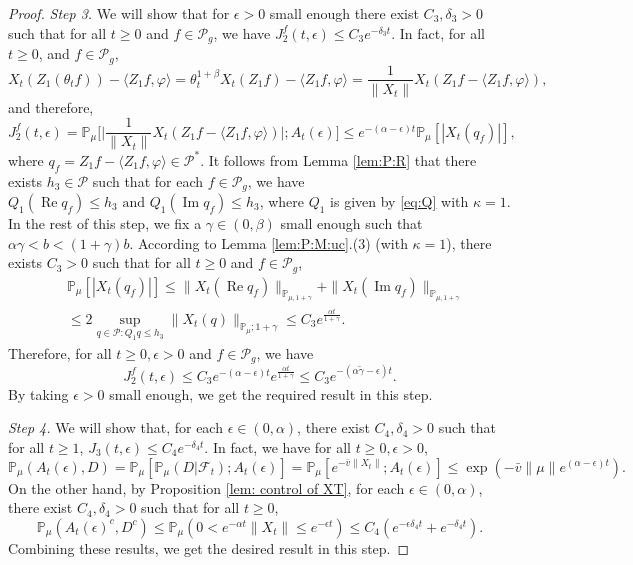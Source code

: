 \documentclass[EJP]{ejpecp} %
\begin{document}
\begin{proof}
	\emph{Step 3.} We will show that for $\epsilon>0$ small enough there exist $C_3, \delta_3 > 0$ such that for all $t \geq 0$ and $f\in \mathcal P_g$,  we have $ J^f_2(t,\epsilon) \leq C_3 e^{-\delta_3 t}$.
	In fact, for all $t\geq 0$, and $f\in \mathcal P_g$,
\[
	X_{t}(Z_1(\theta_t f))- \langle Z_1f, \varphi\rangle
   	= \theta_t^{1+\beta} X_t(Z_1 f) - \langle  Z_1 f,\varphi \rangle
   	= \frac{1}{\|X_{t}\|}X_t(Z_1f - \langle  Z_1 f ,\varphi \rangle),
\]
	and therefore,
\begin{equation}
\label{eq: prevJ2}
	J^f_2(t,\epsilon)
	= \mathbb P_\mu\Big[\Big|  \frac{1}{\|X_{t}\|}X_t(Z_1f - \langle  Z_1 f ,\varphi \rangle) \Big|;A_t(\epsilon)\Big]
    \leq e^{-(\alpha-\epsilon)t} \mathbb{P}_{\mu}[|X_t (q_f) |],
\end{equation}
	where $ q_f = Z_1 f-\langle  Z_1 f,\varphi\rangle \in \mathcal P^*$.
	It follows from Lemma \ref{lem:P:R} that there exists $h_{3}\in \mathcal{P}$ such that for each $ f\in \mathcal P_g$, we have $Q_1 (\operatorname{Re} q_f) \leq h_{3} \text{ and } Q_1 (\operatorname{Im} q_f)\leq h_3$, where $Q_1$ is given by \eqref{eq:Q} with $\kappa=1$.
	In the rest of this step, we  fix a $\gamma\in(0,\beta)$ small enough such that $\alpha \gamma < b < (1+\gamma)b$.
	According to Lemma \ref{lem:P:M:uc}.(3) (with $\kappa=1$), there exists $C_{3}>0$ such that for all $t\geq 0$ and $f\in \mathcal P_g$,
\begin{align}
	& \mathbb{P}_{\mu}\left[\left|X_{t}(q_f)\right|\right]
    \leq \| X_{t}( \operatorname{Re} q_f)\|_{\mathbb{P}_{\mu,1+\gamma}} + \| X_{t}(\operatorname{Im} q_f)\|_{\mathbb{P}_{\mu,1+\gamma}} \\
	& \leq 2\sup_{q\in \mathcal P: Q_1 q\leq h_{3}} \|X_t(q)\|_{\mathbb P_\mu; 1+\gamma} \leq C_{3} e^{\frac{\alpha t}{1+\gamma}}.
\end{align}
	Therefore, for all $t\geq 0, \epsilon > 0$ and $f \in \mathcal P_g$, we have
\begin{equation}
	\label{eq: right bound for J2}
	J^f_2(t, \epsilon)
    \leq  C_3 e^{-(\alpha-\epsilon)t}e^{\frac{\alpha t}{1+\gamma}}
   	\leq C_{3} e^{-(\alpha\tilde \gamma -\epsilon)t}.
\end{equation}
	By taking $\epsilon >0$ small enough, we get the required result in this step.

	\emph{Step 4.} We will show that, for each $\epsilon\in (0,  \alpha)$, there exist $C_4,\delta_4>0$ such that for all $t\geq 1$, $J_3(t,\epsilon)\leq C_4e^{-\delta_4 t}.$
	In fact, we have  for all $t\geq 0, \epsilon >0$,
\[
  	\mathbb P_{\mu}(A_{t}(\epsilon), D)
  	= \mathbb P_{\mu}[\mathbb P_{\mu}(D|\mathscr F_t);A_t(\epsilon)]
  	= \mathbb P_\mu[e^{-\bar v\|X_t\|};A_t(\epsilon)]
  	\leq \exp({-\bar v \|\mu\|e^{(\alpha - \epsilon)t}}).
\]
	On the other hand, by Proposition \ref{lem: control of XT}, for each $\epsilon \in (0, \alpha)$,
there exist  $C_{4}, \delta_{4}>0$ such that for all $t\geq 0$,
\[
  	\mathbb P_\mu(A_t(\epsilon)^c,D^c)
  	\leq \mathbb P_\mu(0 < e^{-\alpha t}\|X_t\|
  	\leq e^{ - \epsilon t}) \leq C_{4} (e^{-\epsilon \delta_{4} t}+e^{-\delta_{4} t}).
\]
 	Combining these results, we get the desired result in this step.


\end{proof}
\end{document}
